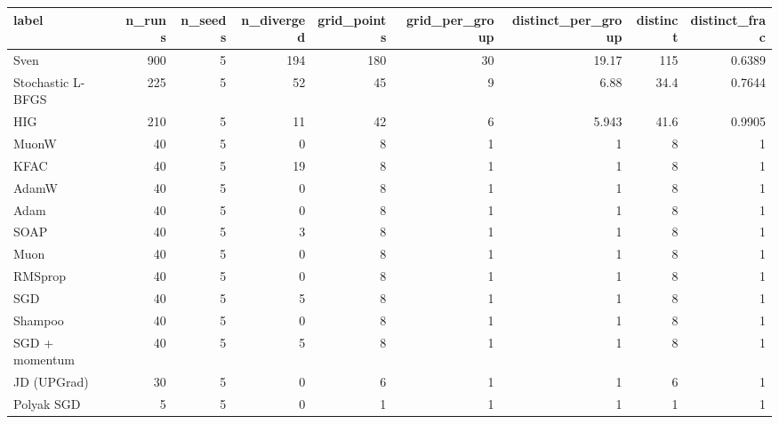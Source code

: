 \begin{tabular}{lrrrrrrrr}
\toprule
label & n\_runs & n\_seeds & n\_diverged & grid\_points & grid\_per\_group & distinct\_per\_group & distinct & distinct\_frac \\
\midrule
Sven & 900 & 5 & 194 & 180 & 30 & 19.17 & 115 & 0.6389 \\
Stochastic L-BFGS & 225 & 5 & 52 & 45 & 9 & 6.88 & 34.4 & 0.7644 \\
HIG & 210 & 5 & 11 & 42 & 6 & 5.943 & 41.6 & 0.9905 \\
MuonW & 40 & 5 & 0 & 8 & 1 & 1 & 8 & 1 \\
KFAC & 40 & 5 & 19 & 8 & 1 & 1 & 8 & 1 \\
AdamW & 40 & 5 & 0 & 8 & 1 & 1 & 8 & 1 \\
Adam & 40 & 5 & 0 & 8 & 1 & 1 & 8 & 1 \\
SOAP & 40 & 5 & 3 & 8 & 1 & 1 & 8 & 1 \\
Muon & 40 & 5 & 0 & 8 & 1 & 1 & 8 & 1 \\
RMSprop & 40 & 5 & 0 & 8 & 1 & 1 & 8 & 1 \\
SGD & 40 & 5 & 5 & 8 & 1 & 1 & 8 & 1 \\
Shampoo & 40 & 5 & 0 & 8 & 1 & 1 & 8 & 1 \\
SGD + momentum & 40 & 5 & 5 & 8 & 1 & 1 & 8 & 1 \\
JD (UPGrad) & 30 & 5 & 0 & 6 & 1 & 1 & 6 & 1 \\
Polyak SGD & 5 & 5 & 0 & 1 & 1 & 1 & 1 & 1 \\
\bottomrule
\end{tabular}
